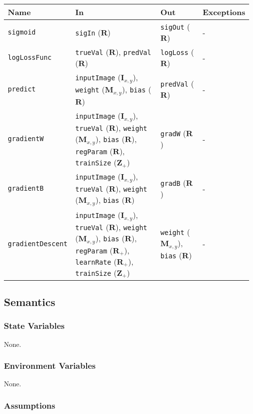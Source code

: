 \documentclass[12pt, titlepage]{article}
\def\code#1{\texttt{#1}}
\begin{document}
\begin{center}
\begin{tabular}{p{2cm} p{4cm} p{4cm} p{2cm}}
\hline
\textbf{Name} & \textbf{In} & \textbf{Out} & \textbf{Exceptions} \\
\hline
\code{sigmoid} & \code{sigIn} ($\mathbf{R}$) & \code{sigOut} ($\mathbf{R}$) & - \\
\code{logLossFunc} & \code{trueVal} ($\mathbf{R}$), \code{predVal} ($\mathbf{R}$) & \code{logLoss} ($\mathbf{R}$) & - \\
\code{predict} & \code{inputImage} ($\mathbf{I}_{x,y}$), \code{weight} ($\mathbf{M}_{x,y}$), \code{bias} ($\mathbf{R}$) & \code{predVal} ($\mathbf{R}$) & - \\
\code{gradientW} & \code{inputImage} ($\mathbf{I}_{x,y}$), \code{trueVal} ($\mathbf{R}$), \code{weight} ($\mathbf{M}_{x,y}$), \code{bias} ($\mathbf{R}$), \code{regParam} ($\mathbf{R}$), \code{trainSize} ($\mathbf{Z}_{+}$)& \code{gradW} ($\mathbf{R}$) & - \\
\code{gradientB} & \code{inputImage} ($\mathbf{I}_{x,y}$), \code{trueVal} ($\mathbf{R}$), \code{weight} ($\mathbf{M}_{x,y}$), \code{bias} ($\mathbf{R}$)& \code{gradB} ($\mathbf{R}$) & - \\
\code{gradientDescent} & \code{inputImage} ($\mathbf{I}_{x,y}$), \code{trueVal} ($\mathbf{R}$), \code{weight} ($\mathbf{M}_{x,y}$), \code{bias} ($\mathbf{R}$), \code{regParam} ($\mathbf{R}_{+}$), \code{learnRate} ($\mathbf{R}_{+}$), \code{trainSize} ($\mathbf{Z}_{+}$) & \code{weight} ($\mathbf{M}_{x,y}$), \code{bias} ($\mathbf{R}$) & - \\
\hline
\end{tabular}
\end{center}

\subsection{Semantics}

\subsubsection{State Variables}

None.

\subsubsection{Environment Variables}

None.

\subsubsection{Assumptions}
\end{document}
